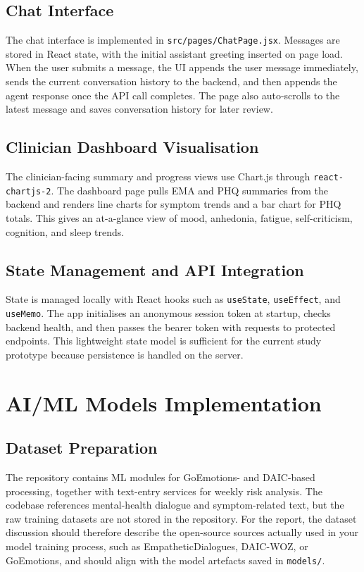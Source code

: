 \subsection{Chat Interface}

The chat interface is implemented in \texttt{src/pages/ChatPage.jsx}. Messages are stored in React state, with the initial assistant greeting inserted on page load. When the user submits a message, the UI appends the user message immediately, sends the current conversation history to the backend, and then appends the agent response once the API call completes. The page also auto-scrolls to the latest message and saves conversation history for later review.

\subsection{Clinician Dashboard Visualisation}

The clinician-facing summary and progress views use Chart.js through \texttt{react-chartjs-2}. The dashboard page pulls EMA and PHQ summaries from the backend and renders line charts for symptom trends and a bar chart for PHQ totals. This gives an at-a-glance view of mood, anhedonia, fatigue, self-criticism, cognition, and sleep trends.

\subsection{State Management and API Integration}

State is managed locally with React hooks such as \texttt{useState}, \texttt{useEffect}, and \texttt{useMemo}. The app initialises an anonymous session token at startup, checks backend health, and then passes the bearer token with requests to protected endpoints. This lightweight state model is sufficient for the current study prototype because persistence is handled on the server.

\section{AI/ML Models Implementation}

\subsection{Dataset Preparation}

The repository contains ML modules for GoEmotions- and DAIC-based processing, together with text-entry services for weekly risk analysis. The codebase references mental-health dialogue and symptom-related text, but the raw training datasets are not stored in the repository. For the report, the dataset discussion should therefore describe the open-source sources actually used in your model training process, such as EmpatheticDialogues, DAIC-WOZ, or GoEmotions, and should align with the model artefacts saved in \texttt{models/}.

